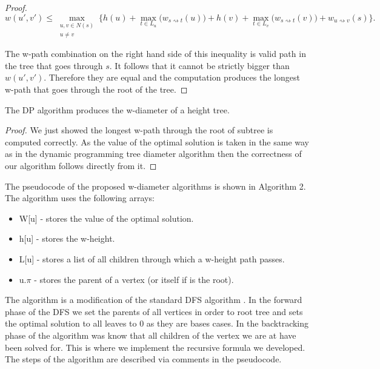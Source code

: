 \begin{proof}
   $$ w(u', v') \le \max\limits_{\substack{u, v \in N(s) \\ u \ne v}}\{ h(u) + \max\limits_{t \in L_u}\Big(w_{s \rightsquigarrow t}(u)\Big) + h(v) + \max\limits_{t \in L_v}\Big(w_{s \rightsquigarrow t}(v)\Big) + w_{u \rightsquigarrow v}(s)\}. $$

   The w-path combination on the right hand side of this inequality is valid path in the tree that goes through $s$. It follows that it cannot be strictly bigger than $w(u', v')$. Therefore they are equal and the computation produces the longest w-path that goes through the root of the tree.

   \end{proof}

\begin{lem} The DP algorithm produces the w-diameter of a height tree. \end{lem}

\begin{proof}

   We just showed the longest w-path through the root of subtree is computed correctly. As the value of the optimal solution is taken in the same way as in the dynamic programming tree diameter algorithm then the correctness of our algorithm follows directly from it.

\end{proof}

The pseudocode of the proposed w-diameter algorithms is shown in Algorithm 2. The algorithm uses the following arrays:

\begin{itemize}
    \item W[u] - stores the value of the optimal solution.
    \item h[u] - stores the w-height.
    \item L[u] - stores a list of all children through which a w-height path passes.
    \item u.$\pi$ - stores the parent of a vertex (or itself if is the root).
\end{itemize}

The algorithm is a modification of the standard DFS algorithm \cite{intro-to-algo}. In the forward phase of the DFS we set the parents of all vertices in order to root tree and sets the optimal solution to all leaves to 0 as they are bases cases. In the backtracking phase of the algorithm was know that all children of the vertex we are at have been solved for. This is where we implement the recursive formula we developed. The steps of the algorithm are described via comments in the pseudocode.

